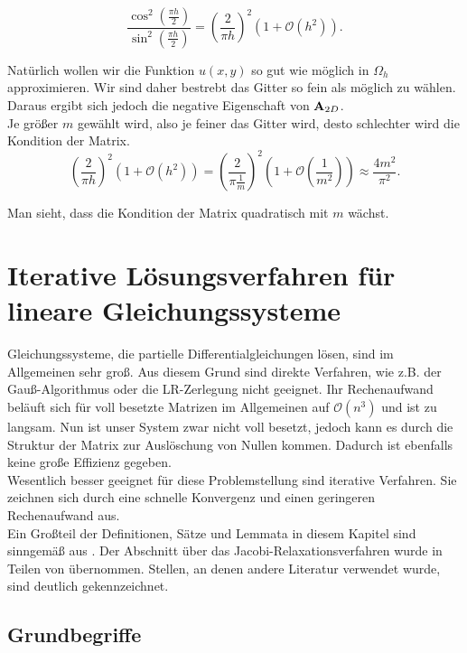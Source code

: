 \begin{equation}
\frac {\cos^{2} (\frac {\pi h} {2})} {\sin^{2} (\frac {\pi h} {2})} = \left( \frac {2} {\pi h} \right)^{2} (1 + \mathcal{O}(h^{2})).
\end{equation}

Natürlich wollen wir die Funktion $u(x,y)$ so gut wie möglich in $\Omega_{h}$ approximieren. Wir sind daher bestrebt das Gitter so fein als möglich zu wählen. Daraus ergibt sich jedoch die negative Eigenschaft von ${\textbf{A}}_{2D}$. \\
Je größer $m$ gewählt wird, also je feiner das Gitter wird, desto schlechter wird die Kondition der Matrix.
\begin{equation}
\left( \frac {2} {\pi h} \right)^{2} (1 + \mathcal{O}(h^{2})) = \left( \frac {2} {\pi \frac {1} {m}} \right)^{2} (1 + \mathcal{O}(\frac {1} {m^{2}})) \approx \frac {4m^{2}} {\pi^{2}}. \label{eq.kondition von PMatrix}
\end{equation}

Man sieht, dass die Kondition der Matrix quadratisch mit $m$ wächst.

\chapter{Iterative Lösungsverfahren für lineare Gleichungssysteme}\label{c.IterativeVerfahren}

Gleichungssysteme, die partielle Differentialgleichungen lösen, sind im Allgemeinen sehr groß. Aus diesem Grund sind direkte Verfahren, wie z.B. der Gauß-Algorithmus oder die LR-Zerlegung nicht geeignet. Ihr Rechenaufwand beläuft sich für voll besetzte Matrizen im Allgemeinen auf $\mathcal{O}(n^{3})$ und ist zu langsam. Nun ist unser System zwar nicht voll besetzt, jedoch kann es durch die Struktur der Matrix zur Auslöschung von Nullen kommen. Dadurch ist ebenfalls keine große Effizienz gegeben.\\
Wesentlich besser geeignet für diese Problemstellung sind iterative Verfahren. Sie zeichnen sich durch eine schnelle Konvergenz und einen geringeren Rechenaufwand aus.\\
Ein Großteil der Definitionen, Sätze und Lemmata in diesem Kapitel sind sinngemäß aus \cite[S. 549-583]{DR08}. Der Abschnitt über das Jacobi-Relaxationsverfahren wurde in Teilen von \cite[S. 414-416]{SAAD03} übernommen. Stellen, an denen andere Literatur verwendet wurde, sind deutlich gekennzeichnet.

\section{Grundbegriffe}\label{s.Grundbegriffe}

